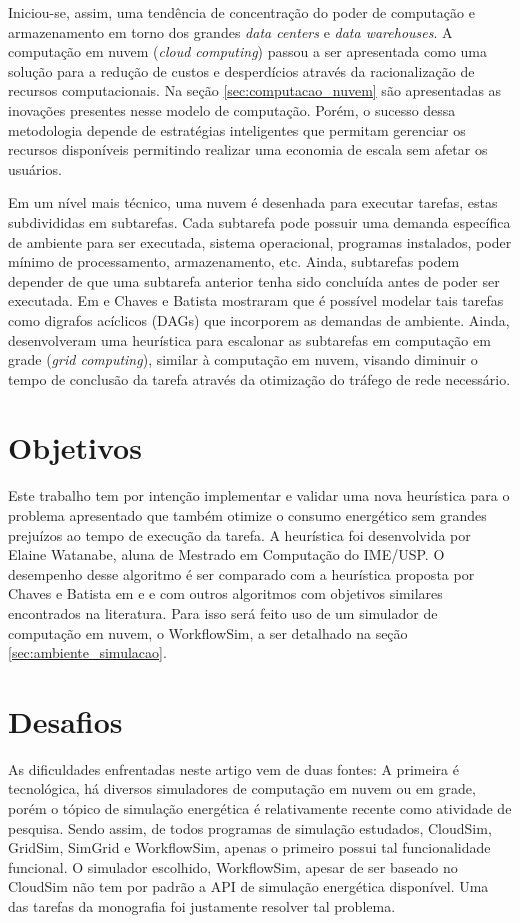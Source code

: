 Iniciou-se, assim, uma tendência de concentração do poder de computação e 
armazenamento em torno dos grandes \emph{data centers} e \emph{data warehouses}.
A computação em nuvem (\emph{cloud computing}) passou a ser apresentada como
uma solução para a redução de custos e desperdícios através da
racionalização de recursos computacionais. Na seção \ref{sec:computacao_nuvem}
são apresentadas as inovações presentes nesse modelo de computação. Porém, o 
sucesso dessa metodologia depende de estratégias inteligentes que permitam 
gerenciar os recursos disponíveis permitindo realizar uma economia de escala
sem afetar os usuários.

Em um nível mais técnico, uma nuvem é desenhada para executar tarefas, estas
subdivididas em subtarefas. Cada subtarefa pode possuir uma demanda específica
de ambiente para ser executada, sistema operacional, programas instalados, poder
mínimo de processamento, armazenamento, etc. Ainda, subtarefas podem depender de
que uma subtarefa anterior tenha sido concluída antes de poder ser executada. Em
\cite{chaves:scheduling_software_requirements} e 
\cite{batista:embedding_software_requirements} Chaves e Batista mostraram que é 
possível modelar tais tarefas como digrafos acíclicos (DAGs) que incorporem as
demandas de ambiente. Ainda, desenvolveram uma heurística para escalonar as
subtarefas em computação em grade (\emph{grid computing}), similar à computação
em nuvem, visando diminuir o tempo de conclusão da tarefa através da otimização
do tráfego de rede necessário.


\section{Objetivos}
\label{sec:objetivos}
Este trabalho tem por intenção implementar e validar uma nova heurística para o
problema apresentado que também otimize o consumo energético sem grandes prejuízos
ao tempo de execução da tarefa. A heurística foi desenvolvida por Elaine Watanabe, 
aluna de Mestrado em Computação do IME/USP. O desempenho desse algoritmo é
ser comparado com a heurística proposta por Chaves e Batista em
\cite{chaves:scheduling_software_requirements} e
\cite{batista:embedding_software_requirements} e com outros algoritmos com
objetivos similares encontrados na literatura. Para isso será feito uso de um
simulador de computação em nuvem, o WorkflowSim, a ser detalhado na seção
\ref{sec:ambiente_simulacao}.


\section{Desafios}
\label{sec:desafios}
As dificuldades enfrentadas neste artigo vem de duas fontes: A primeira é
tecnológica, há diversos simuladores de computação em nuvem ou em grade, porém
o tópico de simulação energética é relativamente recente como atividade de 
pesquisa. Sendo assim, de todos programas de simulação estudados, CloudSim, 
GridSim, SimGrid e WorkflowSim, apenas o primeiro possui tal funcionalidade
funcional. O simulador escolhido, WorkflowSim, apesar de ser baseado no CloudSim 
não tem por padrão a API de simulação energética disponível. Uma das tarefas da
monografia foi justamente resolver tal problema.

